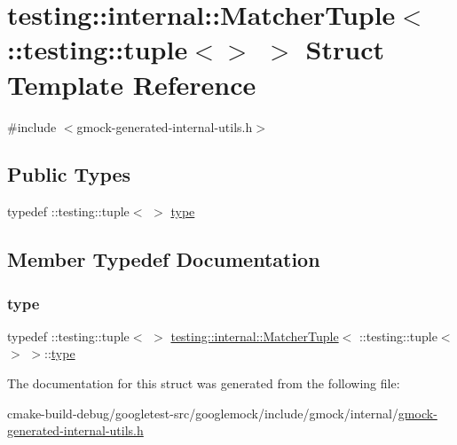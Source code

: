 \hypertarget{structtesting_1_1internal_1_1MatcherTuple_3_01_1_1testing_1_1tuple_3_4_01_4}{}\section{testing\+::internal\+::Matcher\+Tuple$<$ \+::testing\+::tuple$<$$>$ $>$ Struct Template Reference}
\label{structtesting_1_1internal_1_1MatcherTuple_3_01_1_1testing_1_1tuple_3_4_01_4}


{\ttfamily \#include $<$gmock-\/generated-\/internal-\/utils.\+h$>$}

\subsection*{Public Types}
\begin{DoxyCompactItemize}
\item 
typedef \+::testing\+::tuple$<$ $>$ \mbox{\hyperlink{structtesting_1_1internal_1_1MatcherTuple_3_01_1_1testing_1_1tuple_3_4_01_4_a8d4493b2b299322e6c885dee5473ebd7}{type}}
\end{DoxyCompactItemize}


\subsection{Member Typedef Documentation}
\mbox{\label{structtesting_1_1internal_1_1MatcherTuple_3_01_1_1testing_1_1tuple_3_4_01_4_a8d4493b2b299322e6c885dee5473ebd7}} 
\subsubsection{\texorpdfstring{type}{type}}
{\footnotesize\ttfamily typedef \+::testing\+::tuple$<$ $>$ \mbox{\hyperlink{structtesting_1_1internal_1_1MatcherTuple}{testing\+::internal\+::\+Matcher\+Tuple}}$<$ \+::testing\+::tuple$<$$>$ $>$\+::\mbox{\hyperlink{structtesting_1_1internal_1_1MatcherTuple_3_01_1_1testing_1_1tuple_3_4_01_4_a8d4493b2b299322e6c885dee5473ebd7}{type}}}



The documentation for this struct was generated from the following file\+:\begin{DoxyCompactItemize}
\item 
cmake-\/build-\/debug/googletest-\/src/googlemock/include/gmock/internal/\mbox{\hyperlink{gmock-generated-internal-utils_8h}{gmock-\/generated-\/internal-\/utils.\+h}}\end{DoxyCompactItemize}

